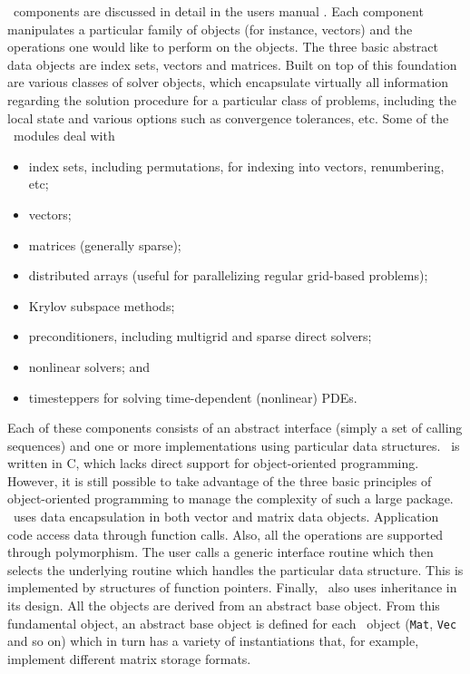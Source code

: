	\petsc\ components are discussed in detail in the users manual \citep{Balay:2002:PUM}. Each component manipulates a particular family of objects (for instance, vectors) and the operations one would like to perform on the objects. 
	The three basic abstract data objects are index sets, vectors and matrices. Built on top of this foundation are various classes of solver objects, which encapsulate virtually all information regarding the solution procedure for a particular class of problems, including the local state and various options such as convergence tolerances, etc. 
Some of the \petsc\ modules deal with 
\begin{itemize} 
\item index sets, including permutations, for indexing into vectors, renumbering, etc;
\item vectors;
\item matrices (generally sparse);
\item distributed arrays (useful for parallelizing regular grid-based problems);
\item Krylov subspace methods;
\item preconditioners, including multigrid and sparse direct solvers;
\item nonlinear solvers; and
\item timesteppers for solving time-dependent (nonlinear) PDEs.
\end{itemize}
Each of these components consists of an abstract interface (simply a set of calling sequences) and one or more implementations using particular data structures. \petsc\ is written in C, which lacks direct support for object-oriented programming. However, it is still possible to take advantage of the three basic principles of object-oriented programming to manage the complexity of such a large package. \petsc\ uses data encapsulation in both vector and matrix data objects. Application code access data through function calls. Also, all the operations are supported through polymorphism. The user calls a generic interface routine which then selects the underlying routine which handles the particular data structure. This is implemented by structures of function pointers. Finally, \petsc\ also uses inheritance in its design. All the objects are derived from an abstract base object. From this fundamental object, an abstract base object is defined for each \petsc\ object (\texttt{Mat}, \texttt{Vec} and so on) which in turn has a variety of instantiations that, for example, implement different matrix storage formats.

